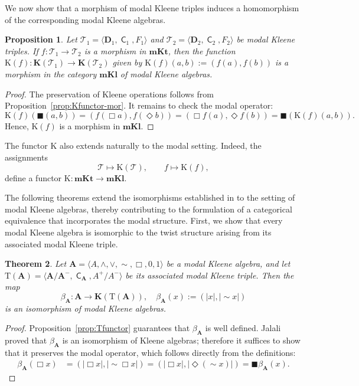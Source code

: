 \documentclass[10pt,a4paper]{amsart}
\newtheorem{theorem}{Theorem}[section]
\newtheorem{proposition}[theorem]{Proposition}
\DeclareMathOperator{\con}{\mathsf{C}}
\newcommand{\A}{\mathbf{A}}
\newcommand{\D}{\mathbf{D}}
\newcommand{\T}{\mathcal{T}}
\newcommand{\boxn}{\blacksquare}
\begin{document}
We now show that a morphism of modal Kleene triples induces a homomorphism of the corresponding modal Kleene algebras.

\begin{proposition}\label{morfismo mkt}
    Let $\T_1=\langle \D_1, \con_1, F_1 \rangle$ and $\T_2=\langle \D_2, \con_2, F_2 \rangle$ be modal Kleene triples. If $f: \T_1 \rightarrow \T_2$ is a morphism in $\mathbf{mKt}$, then the function $\mathrm{K}(f): \mathbf{K}(\T_1) \rightarrow \mathbf{K}(\T_2)$ given by $\mathrm{K}(f)(a,b) := (f(a), f(b))$ is a morphism in the category $\mathbf{mKl}$ of modal Kleene algebras.
\end{proposition}
\begin{proof}    
    The preservation of Kleene operations follows from Proposition~\ref{prop:Kfunctor-mor}. It remains to check the modal operator:
    \[
        \mathrm{K}(f)(\boxn(a,b)) = (f(\Box a), f(\Diamond b)) = (\Box f(a), \Diamond f(b)) = \boxn(\mathrm{K}(f)(a,b)).
    \]
    Hence, $\mathrm{K}(f)$ is a morphism in $\mathbf{mKl}$.
\end{proof}

The functor $\mathrm{K}$ also extends naturally to the modal setting. Indeed, the assignments
\[ \mathcal{T}\mapsto\mathrm{K}(\mathcal{T}),\qquad f\mapsto\mathrm{K}(f), \] 
define a functor $\mathrm{K}\colon\mathbf{mKt}\to\mathbf{mKl}$.

The following theorems extend the isomorphisms established in \cite{jalali} to the setting of modal Kleene algebras, thereby contributing to the formulation of a categorical equivalence that incorporates the modal structure. First, we show that every modal Kleene algebra is isomorphic to the twist structure arising from its associated modal Kleene triple.

\begin{theorem}
\label{thm:beta-iso}
    Let $\A = \langle A, \wedge, \vee, \sim, \Box, 0, 1 \rangle$ be a modal Kleene algebra, and let $\mathrm{T}(\A)=\langle\A/\A^{-}, \con_{\A},A^{+}  / A^{-} \rangle$ be its associated modal Kleene triple. Then the map
    \[
        \beta_\A \colon \A \to \mathbf{K}(\mathrm{T}(\A)), \quad \beta_\A(x) := (|x|, |\sim x|)
    \]
    is an isomorphism of modal Kleene algebras.
\end{theorem}
\begin{proof}
    Proposition~\ref{prop:Tfunctor} guarantees that $\beta_\A$ is well defined.  Jalali \cite{jalali} proved that $\beta_\A$ is an isomorphism of Kleene algebras; therefore it suffices to show that it preserves the modal operator, which follows directly from the definitions:
    \begin{align*}
        \beta_\A(\Box x) &= (|\Box x|, |\sim \Box x|) = (|\Box x|, |\Diamond (\sim x)|) = \boxn  \beta_\A(x).
    \end{align*}  
\end{proof}
\end{document}
